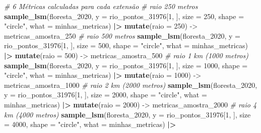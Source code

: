 \documentclass[
]{article}
\newenvironment{Shaded}{\begin{snugshade}}{\end{snugshade}}
\newcommand{\AttributeTok}[1]{\textcolor[rgb]{0.13,0.29,0.53}{#1}}
\newcommand{\CommentTok}[1]{\textcolor[rgb]{0.56,0.35,0.01}{\textit{#1}}}
\newcommand{\DecValTok}[1]{\textcolor[rgb]{0.00,0.00,0.81}{#1}}
\newcommand{\FunctionTok}[1]{\textcolor[rgb]{0.13,0.29,0.53}{\textbf{#1}}}
\newcommand{\NormalTok}[1]{#1}
\newcommand{\OtherTok}[1]{\textcolor[rgb]{0.56,0.35,0.01}{#1}}
\newcommand{\SpecialCharTok}[1]{\textcolor[rgb]{0.81,0.36,0.00}{\textbf{#1}}}
\newcommand{\StringTok}[1]{\textcolor[rgb]{0.31,0.60,0.02}{#1}}
\begin{document}
\begin{Shaded}
\begin{Highlighting}[]
\CommentTok{\# 6 Métricas calculadas para cada extensão}
\CommentTok{\# raio 250 metros}
\FunctionTok{sample\_lsm}\NormalTok{(floresta\_2020, }\AttributeTok{y =}\NormalTok{ rio\_pontos\_31976[}\DecValTok{1}\NormalTok{, ], }
           \AttributeTok{size =} \DecValTok{250}\NormalTok{, }\AttributeTok{shape =} \StringTok{"circle"}\NormalTok{, }
           \AttributeTok{what =}\NormalTok{ minhas\_metricas) }\SpecialCharTok{|\textgreater{}} 
  \FunctionTok{mutate}\NormalTok{(}\AttributeTok{raio =} \DecValTok{250}\NormalTok{) }\OtherTok{{-}\textgreater{}}\NormalTok{ metricas\_amostra\_250 }
\CommentTok{\# raio 500 metros}
\FunctionTok{sample\_lsm}\NormalTok{(floresta\_2020, }\AttributeTok{y =}\NormalTok{ rio\_pontos\_31976[}\DecValTok{1}\NormalTok{, ], }
           \AttributeTok{size =} \DecValTok{500}\NormalTok{, }\AttributeTok{shape =} \StringTok{"circle"}\NormalTok{, }
           \AttributeTok{what =}\NormalTok{ minhas\_metricas)  }\SpecialCharTok{|\textgreater{}} 
   \FunctionTok{mutate}\NormalTok{(}\AttributeTok{raio =} \DecValTok{500}\NormalTok{) }\OtherTok{{-}\textgreater{}}\NormalTok{ metricas\_amostra\_500}
\CommentTok{\# raio 1 km (1000 metros)}
\FunctionTok{sample\_lsm}\NormalTok{(floresta\_2020, }\AttributeTok{y =}\NormalTok{ rio\_pontos\_31976[}\DecValTok{1}\NormalTok{, ], }
           \AttributeTok{size =} \DecValTok{1000}\NormalTok{, }\AttributeTok{shape =} \StringTok{"circle"}\NormalTok{, }
           \AttributeTok{what =}\NormalTok{ minhas\_metricas)  }\SpecialCharTok{|\textgreater{}} 
   \FunctionTok{mutate}\NormalTok{(}\AttributeTok{raio =} \DecValTok{1000}\NormalTok{) }\OtherTok{{-}\textgreater{}}\NormalTok{ metricas\_amostra\_1000}
\CommentTok{\# raio 2 km (2000 metros)}
\FunctionTok{sample\_lsm}\NormalTok{(floresta\_2020, }\AttributeTok{y =}\NormalTok{ rio\_pontos\_31976[}\DecValTok{1}\NormalTok{, ], }
           \AttributeTok{size =} \DecValTok{2000}\NormalTok{, }\AttributeTok{shape =} \StringTok{"circle"}\NormalTok{, }
           \AttributeTok{what =}\NormalTok{ minhas\_metricas) }\SpecialCharTok{|\textgreater{}} 
  \FunctionTok{mutate}\NormalTok{(}\AttributeTok{raio =} \DecValTok{2000}\NormalTok{) }\OtherTok{{-}\textgreater{}}\NormalTok{ metricas\_amostra\_2000}
\CommentTok{\# raio 4 km (4000 metros)}
\FunctionTok{sample\_lsm}\NormalTok{(floresta\_2020, }\AttributeTok{y =}\NormalTok{ rio\_pontos\_31976[}\DecValTok{1}\NormalTok{, ], }
           \AttributeTok{size =} \DecValTok{4000}\NormalTok{, }\AttributeTok{shape =} \StringTok{"circle"}\NormalTok{, }
           \AttributeTok{what =}\NormalTok{ minhas\_metricas)  }\SpecialCharTok{|\textgreater{}} 

\end{Highlighting}
\end{Shaded}
\end{document}
